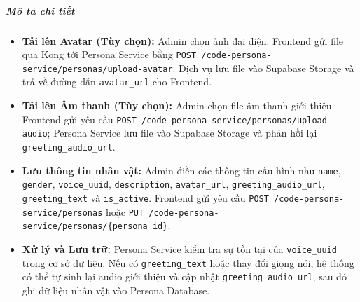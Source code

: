 \subparagraph{Mô tả chi tiết}
\begin{itemize}
\item \textbf{Tải lên Avatar (Tùy chọn):} Admin chọn ảnh đại diện. Frontend gửi file qua Kong tới Persona Service bằng \texttt{POST /code-persona-service/personas/upload-avatar}. Dịch vụ lưu file vào Supabase Storage và trả về đường dẫn \texttt{avatar\_url} cho Frontend.
\item \textbf{Tải lên Âm thanh (Tùy chọn):} Admin chọn file âm thanh giới thiệu. Frontend gửi yêu cầu \texttt{POST /code-persona-service/personas/upload-audio}; Persona Service lưu file vào Supabase Storage và phản hồi lại \texttt{greeting\_audio\_url}.
\item \textbf{Lưu thông tin nhân vật:} Admin điền các thông tin cấu hình như \texttt{name}, \texttt{gender}, \texttt{voice\_uuid}, \texttt{description}, \texttt{avatar\_url}, \texttt{greeting\_audio\_url}, \texttt{greeting\_text} và \texttt{is\_active}. Frontend gửi yêu cầu \texttt{POST /code-persona-service/personas} hoặc \texttt{PUT /code-persona-service/personas/\{persona\_id\}}.
\item \textbf{Xử lý và Lưu trữ:} Persona Service kiểm tra sự tồn tại của \texttt{voice\_uuid} trong cơ sở dữ liệu. Nếu có \texttt{greeting\_text} hoặc thay đổi giọng nói, hệ thống có thể tự sinh lại audio giới thiệu và cập nhật \texttt{greeting\_audio\_url}, sau đó ghi dữ liệu nhân vật vào Persona Database.
\end{itemize}
